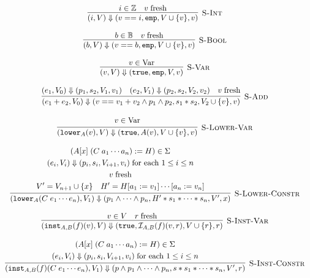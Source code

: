 \begin{figure}
  {
\[
\begin{array}{c}
  \labinfer[S-Int]{(i, \VarSet) \tstep (v == i, \emp, \VarSet \cup \{v\}, v)}
    {i \in \mathbb{Z} &
     \freshVar{v}}
  \\\\
  \labinfer[S-Bool]{(b, \VarSet) \tstep (v == b, \emp, \VarSet \cup \{v\}, v)}
    {b \in \mathbb{B} &
     \freshVar{v}
    }
  \\\\
  \labinfer[S-Var]{(v, \VarSet) \tstep (\texttt{true}, \emp, \VarSet, v)}
    {v \in \Var}
  \\\\
  \ruleSAdd
  \\\\
  \labinfer[S-Lower-Var]{(\lowerS{A}{v}, \VarSet) \tstep (\texttt{true}, A(v), \VarSet \cup \{v\}, v)}
    {\begin{gathered}
      v \in \Var
     \end{gathered}
    }
  \\\\
  \labinfer[S-Lower-Constr]{
        (\lowerS{A}{C\; e_1 \cdots e_n}, \VarSet_1)
          \tstep (p_1 \land \cdots \land p_n, H' \sep s_1 \sep \cdots \sep s_n, \VarSet', x)}
    {\begin{gathered}
          (A[x]\; (C\; a_1 \cdots a_n) := H) \in \Sigma
      \\  (e_i, \VarSet_i) \tstep (p_i, s_i, \VarSet_{i+1}, v_i)\; \textnormal{for each $1 \le i \le n$}
      \\  \freshVar{v}
      \\  \VarSet' = \VarSet_{n+1} \cup \{x\}
      ~~~ H' = H[a_1 := v_1]\cdots[a_n := v_n]
     \end{gathered}
    }
  \\\\
  \labinfer[S-Inst-Var]{(\instantiateS{A,B}{f}(v), \VarSet) \tstep (\texttt{true}, \mathcal{I}_{A,B}(f)(v, r), \VarSet \cup \{r\}, r)}
    {v \in \VarSet & \freshVar{r}}
  \\\\
  \labinfer[S-Inst-Constr]{
        (\instantiateS{A,B}{f}(C\; e_1 \cdots e_n), \VarSet_1)
                                     \tstep (p \land p_1 \land \cdots \land p_n, s \sep s_1 \sep \cdots \sep s_n, \VarSet', r)
      }
    {\begin{gathered}
          (A[x]\; (C\; a_1 \cdots a_n) := H) \in \Sigma
      \\  (e_i, \VarSet_i) \tstep (p_i, s_i, \VarSet_{i+1}, v_i)\; \textnormal{for each $1 \le i \le n$}

\end{gathered}}
\end{array}\]}
\end{figure}
